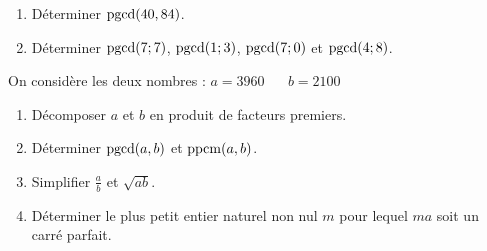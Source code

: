 \documentclass[10pt, a4paper]{article}
\begin{document}
\begin{Application}[][10 min]
\begin{enumerate}[leftmargin=*,itemsep=0.5pt]
    \item Déterminer $\operatorname{pgcd}(40, 84)$.

    \item Déterminer $\operatorname{pgcd}(7;7)$, $\operatorname{pgcd}(1;3)$,  $\operatorname{pgcd}(7;0)$ et $\operatorname{pgcd}(4;8)$.

\end{enumerate}
\end{Application}



\begin{Application}[][20 min]
On considère les deux nombres : $a = 3960$ ~~ $b = 2100$
\begin{enumerate}[leftmargin=*,itemsep=0.5pt]
    \item Décomposer $a$ et $b$ en produit de facteurs premiers.
    \item Déterminer $\operatorname{pgcd}(a,b)$ et $\operatorname{ppcm}(a,b)$.
    \item Simplifier $\frac{a}{b}$ et $\sqrt{ab}$.
    \item Déterminer le plus petit entier naturel non nul $m$ pour lequel $ma$ soit un carré parfait.
\end{enumerate}
\end{Application}
\end{document}
